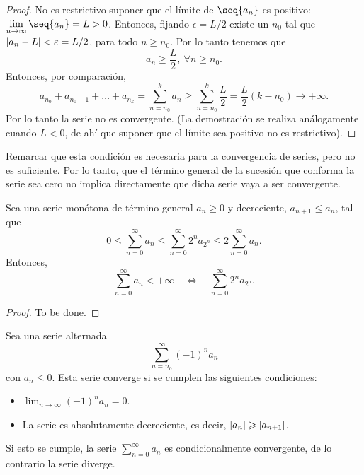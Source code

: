 \begin{proof}
    No es restrictivo suponer que el límite de $\seq{a_n}$ es positivo: $\lim_{n\to\infty}\seq{a_n} = L > 0$. Entonces, fijando $\epsilon = L / 2$ existe un $n_0$ tal que $\left\vert a_n - L \right\vert < \varepsilon = L / 2$, para todo $n\geq n_0$. Por lo tanto tenemos que
    \begin{equation}
        a_n \geq \frac{L}{2},\ \forall n\geq n_0.
    \end{equation}
    Entonces, por comparación,
    \begin{equation}
        a_{n_0} + a_{n_0 + 1} + \ldots + a_{n_k} = \sum_{n=n_0}^k a_n \geq \sum_{n=n_0}^k \frac{L}{2} = \frac{L}{2}\left( k - n_0 \right) \longrightarrow +\infty.
    \end{equation}
    Por lo tanto la serie no es convergente. (La demostración se realiza análogamente cuando $L < 0$, de ahí que suponer que el límite sea positivo no es restrictivo).
\end{proof}

\begin{remark}
    Remarcar que esta condición es necesaria para la convergencia de series, pero no es suficiente. Por lo tanto, que el término general de la sucesión que conforma la serie sea cero no implica directamente que dicha serie vaya a ser convergente.
\end{remark}

\begin{theorem}
    Sea una serie monótona de término general $a_n\geq 0$ y decreciente, $a_{n + 1}\leq a_n$, tal que
    \begin{equation}
        0\leq \sum_{n=0}^\infty a_n \leq \sum_{n=0}^\infty 2^n a_{2^n} \leq 2\sum_{n=0}^\infty a_n.
    \end{equation}
    Entonces,
    \begin{equation}
        \sum_{n=0}^\infty a_n < +\infty \quad\Longleftrightarrow \quad \sum_{n=0}^\infty 2^n a_{2^n}.
    \end{equation}
\end{theorem}

\begin{proof}
    To be done.
\end{proof}

\begin{theorem}
    Sea una serie alternada
    \begin{equation}
        \sum_{n=n_0}^\infty \left( -1 \right) ^n a_n
    \end{equation}
    con $a_n \leq 0$. Esta serie converge si se cumplen las siguientes condiciones:
    \begin{itemize}[itemsep = -2pt]
        \item $\lim_{n\to\infty} \left( -1 \right) ^n a_n = 0$.
        \item La serie es absolutamente decreciente, es decir, $\left\vert a_n \right\vert \geqslant \left\vert a_{n + 1} \right\vert$.
    \end{itemize}
    Si esto se cumple, la serie $\sum_{n=0}^\infty a_n$ es condicionalmente convergente, de lo contrario la serie diverge.
\end{theorem}

